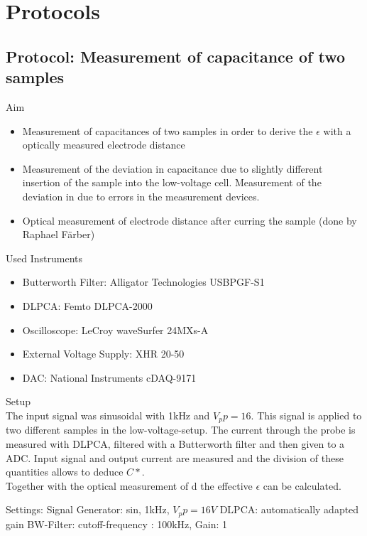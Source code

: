 \chapter{Protocols}
\section{Protocol: Measurement of capacitance of two samples}
\large{Aim} \\
\begin{itemize}

\item Measurement of capacitances of two samples in order to derive the $\epsilon$ with a optically measured electrode distance 
\item Measurement of the deviation in capacitance due to slightly different insertion of the sample into the low-voltage cell. Measurement of the deviation in due to errors in the measurement devices. 
\item Optical measurement of electrode distance after curring the sample (done by Raphael F\"arber) 
\end{itemize}

\large{Used Instruments} 
\begin{itemize}
 \item Butterworth Filter: Alligator Technologies USBPGF-S1
 \item DLPCA: Femto DLPCA-2000
 \item Oscilloscope: LeCroy waveSurfer 24MXs-A
 \item External Voltage Supply:  XHR 20-50
 \item DAC: National Instruments cDAQ-9171

\end{itemize}


\large{Setup} \\
The input signal was  sinusoidal with 1kHz and $V_pp=16$. This signal is applied to two different samples in the low-voltage-setup. The current through the probe is measured with DLPCA, filtered with a Butterworth filter and then given to a ADC. 
Input signal and output current are measured and the division of these quantities allows to deduce $C*$.\\

Together with the optical measurement of d the effective $\epsilon$ can be calculated. 

Settings: \newline
Signal Generator:  sin, 1kHz, $V_pp=16V$
DLPCA:  automatically adapted gain
BW-Filter:  cutoff-frequency : 100kHz, Gain: 1

